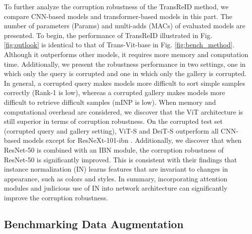 To further analyze the corruption robustness of the TransReID method, we compare CNN-based models and transformer-based models in this part.
The number of parameters (Params) and multi-adds (MACs) of evaluated models are presented.
To begin, the performance of TransReID illustrated in Fig. \ref{fig:outlook} is identical to that of Trans-Vit-base in Fig. \ref{fig:bench_method}. Although it outperforms other models, it requires more memory and computation time.
Additionally, we present the robustness performance in two settings, one in which only the query is corrupted and one in which only the gallery is corrupted. In general, a corrupted query makes models more difficult to sort simple samples correctly (Rank-1 is low), whereas a corrupted gallery makes models more difficult to retrieve difficult samples (mINP is low).
When memory and computational overhead are considered, we discover that the ViT architecture is still superior in terms of corruption robustness.
On the corrupted test set (corrupted query and gallery setting), ViT-S and DeiT-S outperform all CNN-based models except for ResNeXt-101-ibn \cite{DBLP:conf/cvpr/XieGDTH17}.
Additionally, we discover that when ResNet-50 is combined with an IBN \cite{DBLP:conf/eccv/PanLST18} module, the corruption robustness of ResNet-50 is significantly improved. This is consistent with their findings \cite{DBLP:conf/eccv/PanLST18} that instance normalization (IN) learns features that are invariant to changes in appearance, such as colors and styles. In summary, incorporating attention modules and judicious use of IN into network architecture can significantly improve the corruption robustness.



\subsection{Benchmarking Data Augmentation}


